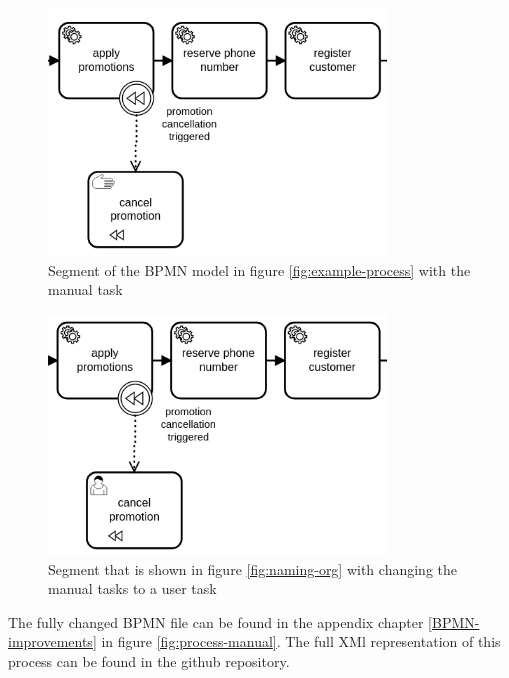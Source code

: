 \begin{minipage}[t]{0.5\textwidth}
	\begin{figure}[H]
		\centering
		\includegraphics[width=0.8\textwidth]{graphics/case-study-manual-org}
		\caption{Segment of the BPMN model in figure \ref{fig:example-process} with the manual task}
		\label{fig:manual-org}
	\end{figure}
\end{minipage}
\begin{minipage}[t]{0.5\textwidth}
\begin{figure}[H]
	\centering
	\includegraphics[width=0.8\textwidth]{graphics/case-study-manual-new}
	\caption{Segment that is shown in figure \ref{fig:naming-org} with changing the manual tasks to a user task}
	\label{fig:manual-new}
\end{figure}
\end{minipage}

The fully changed BPMN file can be found in the appendix chapter \ref{BPMN-improvements} in figure \ref{fig:process-manual}. The full XMl representation of this process can be found in the github repository\cite{appendix-registration-3}.
